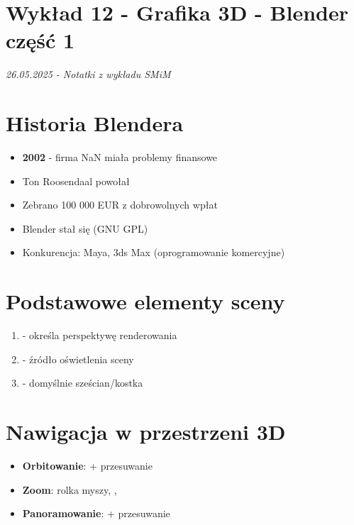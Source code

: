 \section*{Wykład 12 - Grafika 3D - Blender część 1}
\textit{26.05.2025 - Notatki z wykładu SMiM}

\section{Historia Blendera}
\begin{itemize}[itemsep=2pt]
    \item \textbf{2002} - firma NaN miała problemy finansowe
    \item Ton Roosendaal powołał 
    \item Zebrano 100 000 EUR z dobrowolnych wpłat
    \item Blender stał się  (GNU GPL)
    \item Konkurencja: Maya, 3ds Max (oprogramowanie komercyjne)
\end{itemize}

\section{Podstawowe elementy sceny}
\begin{enumerate}
    \item {} - określa perspektywę renderowania
    \item {} - źródło oświetlenia sceny
    \item {} - domyślnie sześcian/kostka
\end{enumerate}

\section{Nawigacja w przestrzeni 3D}
\begin{itemize}[itemsep=2pt]
    \item \textbf{Orbitowanie}:  + przesuwanie
    \item \textbf{Zoom}: rolka myszy, , 
    \item \textbf{Panoramowanie}:  + przesuwanie
\end{itemize}

